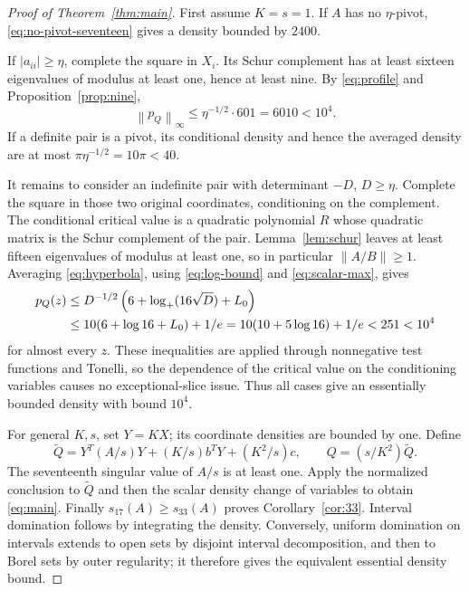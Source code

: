 \documentclass[11pt]{article}
\numberwithin{equation}{section}
\theoremstyle{definition}\newtheorem{definition}[theorem]{Definition}
\theoremstyle{remark}\newtheorem{remark}[theorem]{Remark}
\newcommand{\1}{\mathbf 1}\newcommand{\diag}{\operatorname{diag}}
\newcommand{\norm}[1]{\left\lVert#1\right\rVert}\newcommand{\abs}[1]{\left|#1\right|}
\begin{document}
\begin{proof}[Proof of Theorem~\ref{thm:main}]
First assume $K=s=1$. If $A$ has no $\eta$-pivot, \eqref{eq:no-pivot-seventeen} gives a density bounded by $2400$.

If $|a_{ii}|\ge\eta$, complete the square in $X_i$. Its Schur complement has at least sixteen eigenvalues of modulus at least one, hence at least nine. By \eqref{eq:profile} and Proposition~\ref{prop:nine},
\begin{equation}\label{eq:final-scalar}
 \norm{p_Q}_\infty\le\eta^{-1/2}\cdot601=6010<10^4.
\end{equation}
If a definite pair is a pivot, its conditional density and hence the averaged density are at most $\pi\eta^{-1/2}=10\pi<40$.

It remains to consider an indefinite pair with determinant $-D$, $D\ge\eta$. Complete the square in those two original coordinates, conditioning on the complement. The conditional critical value is a quadratic polynomial $R$ whose quadratic matrix is the Schur complement of the pair. Lemma~\ref{lem:schur} leaves at least fifteen eigenvalues of modulus at least one, so in particular $\norm{A/B}\ge1$. Averaging \eqref{eq:hyperbola}, using \eqref{eq:log-bound} and \eqref{eq:scalar-max}, gives
\begin{align*}
 p_Q(z)&\le D^{-1/2}\left(6+\log_+(16\sqrt D)+L_0\right)\\
 &\le10(6+\log16+L_0)+1/e
 =10(10+5\log16)+1/e<251<10^4
\end{align*}
for almost every $z$. These inequalities are applied through nonnegative test functions and Tonelli, so the dependence of the critical value on the conditioning variables causes no exceptional-slice issue. Thus all cases give an essentially bounded density with bound $10^4$.

For general $K,s$, set $Y=KX$; its coordinate densities are bounded by one. Define
\[
 \widetilde Q=Y^T(A/s)Y+(K/s)b^TY+(K^2/s)c,
 \qquad Q=(s/K^2)\widetilde Q.
\]
The seventeenth singular value of $A/s$ is at least one. Apply the normalized conclusion to $\widetilde Q$ and then the scalar density change of variables to obtain \eqref{eq:main}. Finally $s_{17}(A)\ge s_{33}(A)$ proves Corollary~\ref{cor:33}. Interval domination follows by integrating the density. Conversely, uniform domination on intervals extends to open sets by disjoint interval decomposition, and then to Borel sets by outer regularity; it therefore gives the equivalent essential density bound.
\end{proof}
\end{document}
